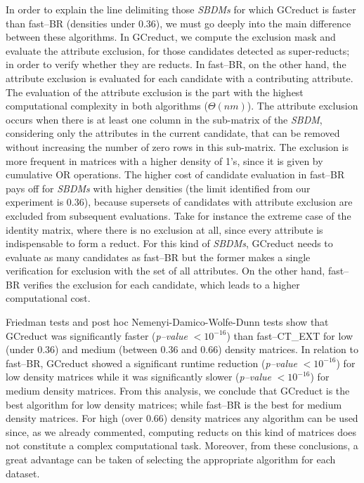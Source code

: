 \documentclass[authoryear,11pt]{elsarticle}
\begin{document}
  In order to explain the line delimiting those \textit{SBDMs} for which GCreduct is faster than fast--BR (densities under 0.36), we must go deeply into the main difference between these algorithms. In GCreduct, we compute the exclusion mask and evaluate the attribute exclusion, for those candidates detected as super-reducts; in order to verify whether they are reducts. In fast--BR, on the other hand, the attribute exclusion is evaluated for each candidate with a contributing attribute. The evaluation of the attribute exclusion is the part with the highest computational complexity in both algorithms ($\Theta (nm)$). The attribute exclusion occurs when there is at least one column in the sub-matrix of the \textit{SBDM}, considering only the attributes in the current candidate, that can be removed without increasing the number of zero rows in this sub-matrix. The exclusion is more frequent in matrices with a higher density of 1's, since it is given by cumulative OR operations. The higher cost of candidate evaluation in fast--BR pays off for \textit{SBDMs} with higher densities (the limit identified from our experiment is 0.36), because supersets of candidates with attribute exclusion are excluded from subsequent evaluations. Take for instance the extreme case of the identity matrix, where there is no exclusion at all, since every attribute is indispensable to form a reduct. For this kind of \textit{SBDMs}, GCreduct needs to evaluate as many candidates as fast--BR but the former makes a single verification for exclusion with the set of all attributes. On the other hand, fast--BR verifies the exclusion for each candidate, which leads to a higher computational cost.

  Friedman tests and post hoc Nemenyi-Damico-Wolfe-Dunn tests show that GCreduct was significantly faster (\textit{p--value} $< 10^{-16}$) than fast--CT\_EXT for low (under 0.36) and medium (between 0.36 and 0.66) density matrices. In relation to fast--BR, GCreduct showed a significant runtime reduction (\textit{p--value} $< 10^{-16}$) for low density matrices while it was significantly slower (\textit{p--value} $< 10^{-16}$) for medium density matrices. From this analysis, we conclude that GCreduct is the best algorithm for low density matrices; while fast--BR is the best for medium density matrices. For high (over 0.66) density matrices any algorithm can be used since, as we already commented, computing reducts on this kind of matrices does not constitute a complex computational task. Moreover, from these conclusions, a great advantage can be taken of selecting the appropriate algorithm for each dataset. 
\end{document}

